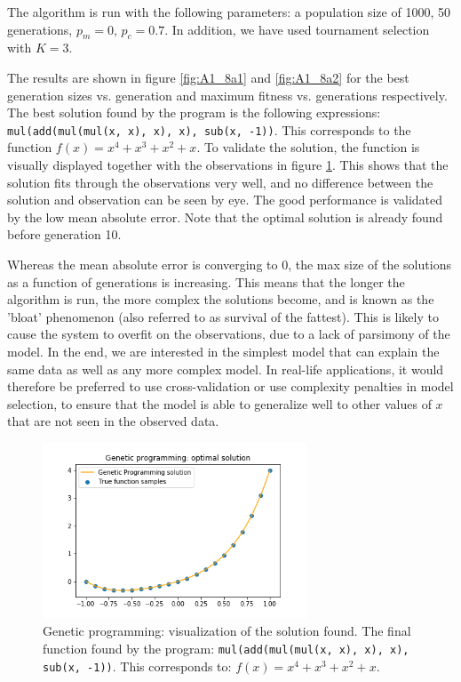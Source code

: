\documentclass{article}
\begin{document}
The algorithm is run with the following parameters: a population size of 1000, 50 generations, $p_m = 0$, $p_c = 0.7$. In addition, we have used tournament selection with $K=3$. 

The results are shown in figure \ref{fig:A1_8a1} and \ref{fig:A1_8a2} for the best generation sizes vs. generation and maximum fitness vs. generations respectively. The best solution found by the program is the following expressions: \texttt{mul(add(mul(mul(x, x), x), x), sub(x, -1))}. This corresponds to the function $f(x) = x^4+x^3+x^2+x$. To validate the solution, the function is visually displayed together with the observations in figure \ref{fig:A1_8a3}. This shows that the solution fits through the observations very well, and no difference between the solution and observation can be seen by eye. The good performance is validated by the low mean absolute error. Note that the optimal solution is already found before generation 10. 

Whereas the mean absolute error is converging to 0, the max size of the solutions as a function of generations is increasing. This means that the longer the algorithm is run, the more complex the solutions become, and is known as the 'bloat' phenomenon (also referred to as survival of the fattest). This is likely to cause the system to overfit on the observations, due to a lack of parsimony of the model. In the end, we are interested in the simplest model that can explain the same data as well as any more complex model. In real-life applications, it would therefore be preferred to use cross-validation or use complexity penalties in model selection, to ensure that the model is able to generalize well to other values of $x$ that are not seen in the observed data. 

\begin{figure}[H]
    \centering
    \includegraphics[width=0.7\textwidth]{Assignment 1/Figures/A1_8a3.png}
    \caption{Genetic programming: visualization of the solution found. The final function found by the program: \texttt{mul(add(mul(mul(x, x), x), x), sub(x, -1))}. This corresponds to: $f(x) = x^4+x^3+x^2+x$.}
    \label{fig:A1_8a3}
\end{figure}
\end{document}
